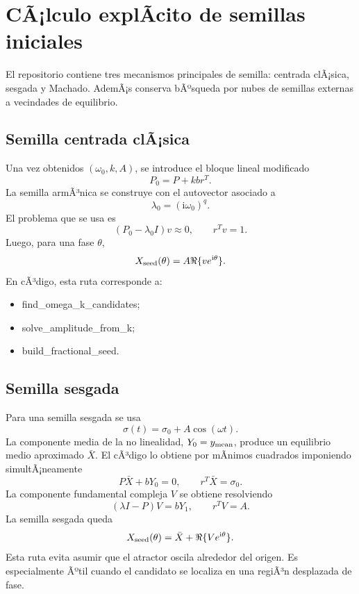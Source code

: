 \documentclass[11pt]{article}
\newcommand{\ii}{\mathrm{i}}
\DeclareRobustCommand{\codepath}[1]{\begingroup\Urlmuskip=0mu plus 2mu\path{#1}\endgroup}
\def\codepath#1{#1}%
\begin{document}
\section{CÃ¡lculo explÃ­cito de semillas iniciales}
\label{sec:calculo_semillas_detallado}

El repositorio contiene tres mecanismos principales de semilla: centrada clÃ¡sica, sesgada y Machado. AdemÃ¡s conserva bÃºsqueda por nubes de semillas externas a vecindades de equilibrio.

\subsection{Semilla centrada clÃ¡sica}

Una vez obtenidos \((\omega_0,k,A)\), se introduce el bloque lineal modificado
\begin{equation}
P_0=P+kb r^T.
\end{equation}
La semilla armÃ³nica se construye con el autovector asociado a
\begin{equation}
\lambda_0=(\ii\omega_0)^q.
\end{equation}
El problema que se usa es
\begin{equation}
(P_0-\lambda_0 I)v\approx 0,
\qquad r^Tv=1.
\end{equation}
Luego, para una fase \(\theta\),
\begin{equation}
X_{\rm seed}(\theta)=A\Re\{v e^{\ii\theta}\}.
\end{equation}
En cÃ³digo, esta ruta corresponde a:
\begin{itemize}
\item \codepath{find_omega_k_candidates};
\item \codepath{solve_amplitude_from_k};
\item \codepath{build_fractional_seed}.
\end{itemize}

\subsection{Semilla sesgada}

Para una semilla sesgada se usa
\begin{equation}
\sigma(t)=\sigma_0+A\cos(\omega t).
\end{equation}
La componente media de la no linealidad, \(Y_0=y_{\rm mean}\), produce un equilibrio medio aproximado \(\bar X\). El cÃ³digo lo obtiene por mÃ­nimos cuadrados imponiendo simultÃ¡neamente
\begin{equation}
P\bar X+bY_0=0,
\qquad r^T\bar X=\sigma_0.
\end{equation}
La componente fundamental compleja \(V\) se obtiene resolviendo
\begin{equation}
(\lambda I-P)V=bY_1,
\qquad r^TV=A.
\end{equation}
La semilla sesgada queda
\begin{equation}
X_{\rm seed}(\theta)=\bar X+\Re\{Ve^{\ii\theta}\}.
\end{equation}
Esta ruta evita asumir que el atractor oscila alrededor del origen. Es especialmente Ãºtil cuando el candidato se localiza en una regiÃ³n desplazada de fase.
\end{document}
